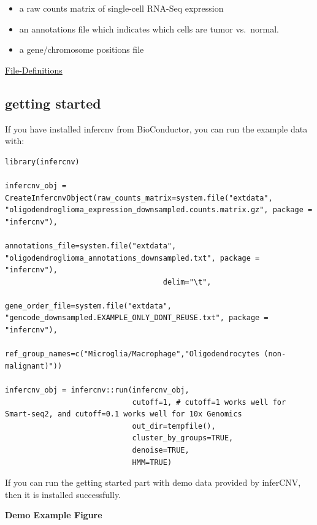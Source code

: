 \documentclass[
]{book}
\providecommand{\tightlist}{%
  \setlength{\itemsep}{0pt}\setlength{\parskip}{0pt}}
\begin{document}
\begin{itemize}
\tightlist
\item
  a raw counts matrix of single-cell RNA-Seq expression
\item
  an annotations file which indicates which cells are tumor vs.~normal.
\item
  a gene/chromosome positions file
\end{itemize}

\href{https://github.com/broadinstitute/inferCNV/wiki/File-Definitions}{File-Definitions}

\hypertarget{getting-started}{%
\subsection{getting started}\label{getting-started}}

If you have installed infercnv from BioConductor, you can run the example data with:

\begin{verbatim}
library(infercnv)

infercnv_obj = CreateInfercnvObject(raw_counts_matrix=system.file("extdata", "oligodendroglioma_expression_downsampled.counts.matrix.gz", package = "infercnv"),
                                    annotations_file=system.file("extdata", "oligodendroglioma_annotations_downsampled.txt", package = "infercnv"),
                                    delim="\t",
                                    gene_order_file=system.file("extdata", "gencode_downsampled.EXAMPLE_ONLY_DONT_REUSE.txt", package = "infercnv"),
                                    ref_group_names=c("Microglia/Macrophage","Oligodendrocytes (non-malignant)")) 

infercnv_obj = infercnv::run(infercnv_obj,
                             cutoff=1, # cutoff=1 works well for Smart-seq2, and cutoff=0.1 works well for 10x Genomics
                             out_dir=tempfile(), 
                             cluster_by_groups=TRUE, 
                             denoise=TRUE,
                             HMM=TRUE)
\end{verbatim}

If you can run the getting started part with demo data provided by inferCNV, then it is installed successfully.

\textbf{Demo Example Figure}
\end{document}
